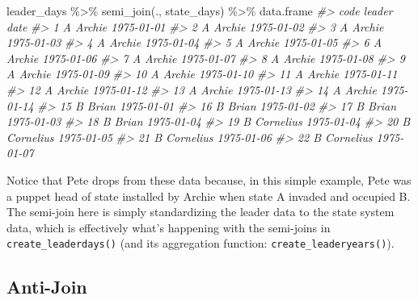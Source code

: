 \documentclass[
  11pt,
]{article}
\newenvironment{Shaded}{\begin{snugshade}}{\end{snugshade}}
\newcommand{\CommentTok}[1]{\textcolor[rgb]{0.56,0.35,0.01}{\textit{#1}}}
\newcommand{\FunctionTok}[1]{\textcolor[rgb]{0.00,0.00,0.00}{#1}}
\newcommand{\NormalTok}[1]{#1}
\newcommand{\SpecialCharTok}[1]{\textcolor[rgb]{0.00,0.00,0.00}{#1}}
\begin{document}
\begin{Shaded}
\begin{Highlighting}[]
\NormalTok{leader\_days }\SpecialCharTok{\%\textgreater{}\%}
  \FunctionTok{semi\_join}\NormalTok{(., state\_days) }\SpecialCharTok{\%\textgreater{}\%}
\NormalTok{  data.frame}
\CommentTok{\#\textgreater{}    code    leader       date}
\CommentTok{\#\textgreater{} 1     A    Archie 1975{-}01{-}01}
\CommentTok{\#\textgreater{} 2     A    Archie 1975{-}01{-}02}
\CommentTok{\#\textgreater{} 3     A    Archie 1975{-}01{-}03}
\CommentTok{\#\textgreater{} 4     A    Archie 1975{-}01{-}04}
\CommentTok{\#\textgreater{} 5     A    Archie 1975{-}01{-}05}
\CommentTok{\#\textgreater{} 6     A    Archie 1975{-}01{-}06}
\CommentTok{\#\textgreater{} 7     A    Archie 1975{-}01{-}07}
\CommentTok{\#\textgreater{} 8     A    Archie 1975{-}01{-}08}
\CommentTok{\#\textgreater{} 9     A    Archie 1975{-}01{-}09}
\CommentTok{\#\textgreater{} 10    A    Archie 1975{-}01{-}10}
\CommentTok{\#\textgreater{} 11    A    Archie 1975{-}01{-}11}
\CommentTok{\#\textgreater{} 12    A    Archie 1975{-}01{-}12}
\CommentTok{\#\textgreater{} 13    A    Archie 1975{-}01{-}13}
\CommentTok{\#\textgreater{} 14    A    Archie 1975{-}01{-}14}
\CommentTok{\#\textgreater{} 15    B     Brian 1975{-}01{-}01}
\CommentTok{\#\textgreater{} 16    B     Brian 1975{-}01{-}02}
\CommentTok{\#\textgreater{} 17    B     Brian 1975{-}01{-}03}
\CommentTok{\#\textgreater{} 18    B     Brian 1975{-}01{-}04}
\CommentTok{\#\textgreater{} 19    B Cornelius 1975{-}01{-}04}
\CommentTok{\#\textgreater{} 20    B Cornelius 1975{-}01{-}05}
\CommentTok{\#\textgreater{} 21    B Cornelius 1975{-}01{-}06}
\CommentTok{\#\textgreater{} 22    B Cornelius 1975{-}01{-}07}
\end{Highlighting}
\end{Shaded}

Notice that Pete drops from these data because, in this simple example, Pete was a puppet head of state installed by Archie when state A invaded and occupied B. The semi-join here is simply standardizing the leader data to the state system data, which is effectively what's happening with the semi-joins in \texttt{create\_leaderdays()} (and its aggregation function: \texttt{create\_leaderyears()}).

\hypertarget{anti-join}{%
\subsection{Anti-Join}\label{anti-join}}
\end{document}
